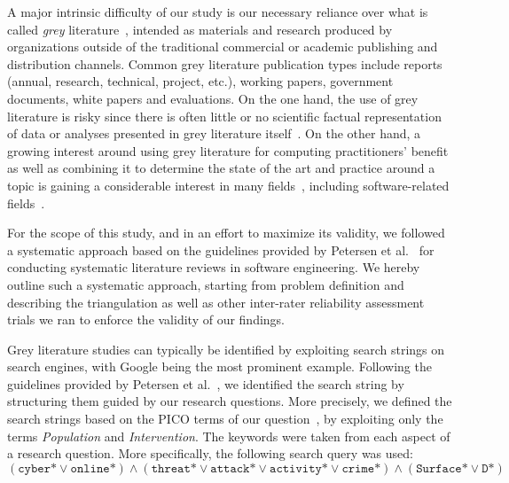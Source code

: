 A major intrinsic difficulty of our study is our necessary reliance over what is called \emph{grey} literature~\cite{GarousiFM16}, intended as materials and research produced by organizations outside of the traditional commercial or academic publishing and distribution channels. Common grey literature publication types include reports (annual, research, technical, project, etc.), working papers, government documents, white papers and evaluations. On the one hand, the use of grey literature is risky since there is often little or no scientific factual representation of data or analyses presented in grey literature itself~\cite{schopfel2010literature}. 
On the other hand, a growing interest around using grey literature for computing practitioners' benefit as well as combining it to determine the state of the art and practice around a topic is gaining a considerable interest in many fields~\cite{schopfel2010literature,stempfhuber2008enhancing}, including software-related fields~\cite{GarousiFM16}.

For the scope of this study, and in an effort to maximize its validity, we followed a systematic approach based on the guidelines provided by Petersen et al.~\cite{sms-petersen} for conducting systematic literature reviews in software engineering. 
We hereby outline such a systematic approach,  starting from problem definition and describing the triangulation as well as other inter-rater reliability assessment trials we ran to enforce the validity of our findings.

Grey literature studies can typically be identified by exploiting search strings on search engines, with Google being the most prominent example.
Following the guidelines provided by Petersen et al.~\cite{sms-petersen}, we identified the search string by structuring them guided by our research questions.
More precisely, we defined the search strings based on the PICO terms of our question~\cite{kitchenham-charters}, by exploiting only the terms {\em Population} and {\em Intervention}.
The keywords %
were taken from each aspect of a research question. More specifically, the following search query was used:
\\
\hspace*{\fill}
$
(\texttt{cyber*} \vee \texttt{online*}) \wedge (\texttt{threat*} \vee \texttt{attack*} \vee \texttt{activity*} \vee \texttt{crime*}) \wedge (\texttt{Surface*} \vee \texttt{D*})
$
\hspace*{\fill}
\\

